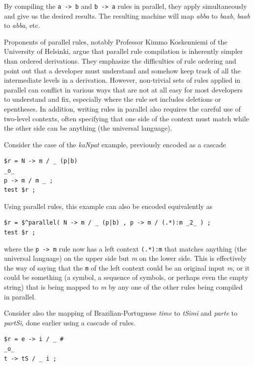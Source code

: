 \noindent
By compiling the \texttt{a -> b} and \texttt{b -> a} rules in parallel, they apply simultaneously and give us the desired
results.
The resulting machine will map \emph{abba} to \emph{baab}, \emph{baab} to \emph{abba},
etc. 


Proponents of parallel rules, notably Professor Kimmo Koskenniemi of the University of
Helsinki, argue that parallel rule compilation is inherently simpler than ordered
derivations.  They emphasize the difficulties of rule ordering and point out that a
developer must understand and somehow keep track of all the intermediate levels in a
derivation.  However, non-trivial sets of rules applied in parallel can conflict in
various ways that are not at all easy for most developers to understand and fix,
especially where the rule set includes deletions or epentheses.  In addition,
writing rules in parallel
also requires the careful use of two-level contexts, often specifying that one side
of the context must match while the other side can be anything (the universal language).

Consider the case of the \emph{kaNpat} example, previously encoded as a cascade 

\begin{Verbatim}
$r = N -> m / _ (p|b)
_o_
p -> m / m _ ;
test $r ;
\end{Verbatim}

\noindent
Using parallel rules, this example can also be encoded equivalently as

\begin{Verbatim}
$r = $^parallel( N -> m / _ (p|b) , p -> m / (.*):m _2_ ) ;
test $r ;
\end{Verbatim}

\noindent
where the \texttt{p -> m} rule now has a left context \texttt{(.*):m} that matches
anything (the universal language) on the upper side but \emph{m} on the lower
side.  This is effectively the way of saying that the \texttt{m} of the left context could
be an original input \emph{m}, or it could be something (a symbol, a sequence of symbols,
or perhaps even the empty string) that is being mapped to \emph{m} by
any one of the other rules
being compiled in parallel.  

Consider also the mapping of Brazilian-Portuguese \emph{time} to \emph{tSimi} and \emph{parte} to \emph{partSi}, done earlier using a cascade of rules.  


\begin{Verbatim}
$r = e -> i / _ #
_o_
t -> tS / _ i ;
\end{Verbatim}

